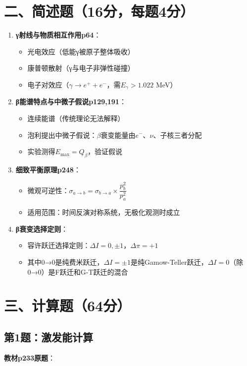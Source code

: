 \documentclass{article}
\begin{document}
\section*{二、简述题（16分，每题4分）}
\begin{enumerate}
  \item \textbf{γ射线与物质相互作用p64}：
  \begin{itemize}
    \item 光电效应（低能γ被原子整体吸收）
    \item 康普顿散射（γ与电子非弹性碰撞）
    \item 电子对效应（$\gamma \to e^+ + e^-$，需$E_\gamma > 1.022$ MeV）
  \end{itemize}

  \item \textbf{β能谱特点与中微子假说p129,191}：
  \begin{itemize}
    \item 连续能谱（传统理论无法解释）
    \item 泡利提出中微子假说：$\beta$衰变能量由$e^-$、$\nu$、子核三者分配
    \item 实验测得$E_{\text{max}} = Q_\beta$，验证假说
  \end{itemize}

  \item \textbf{细致平衡原理p248}：
  \begin{itemize}
    \item 微观可逆性：$\sigma_{a\to b} = \sigma_{b\to a} \times \dfrac{p_b^2}{p_a^2}$
    \item 适用范围：时间反演对称系统，无极化观测时成立
  \end{itemize}

  \item \textbf{β衰变选择定则}：
  \begin{itemize}
    \item 容许跃迁选择定则：$\Delta I=0, \pm 1$，$\Delta\pi=+1$
    \item 其中0→0是纯费米跃迁，$\Delta I=\pm 1$是纯Gamow-Teller跃迁，$\Delta I=0$（除0→0）是F跃迁和G-T跃迁的混合
  \end{itemize}
\end{enumerate}

\section*{三、计算题（64分）}

\subsection*{第1题：激发能计算}
\textbf{教材p233原题}：
\end{document}
